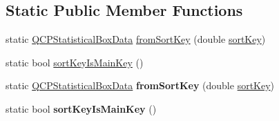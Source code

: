 \subsection*{Static Public Member Functions}
\begin{DoxyCompactItemize}
\item 
static \hyperlink{class_q_c_p_statistical_box_data}{Q\+C\+P\+Statistical\+Box\+Data} \hyperlink{class_q_c_p_statistical_box_data_a8c391d5a6c7cebc79b664aad9917b499}{from\+Sort\+Key} (double \hyperlink{class_q_c_p_statistical_box_data_ad00ab8d43ec89a40ec7ee7ca154a2b0e}{sort\+Key})
\item 
static bool \hyperlink{class_q_c_p_statistical_box_data_a4710ae44b85d4b34b13c3f9301f28c01}{sort\+Key\+Is\+Main\+Key} ()
\item 
static \hyperlink{class_q_c_p_statistical_box_data}{Q\+C\+P\+Statistical\+Box\+Data} {\bfseries from\+Sort\+Key} (double \hyperlink{class_q_c_p_statistical_box_data_ad00ab8d43ec89a40ec7ee7ca154a2b0e}{sort\+Key})\hypertarget{class_q_c_p_statistical_box_data_a8c391d5a6c7cebc79b664aad9917b499}{}\label{class_q_c_p_statistical_box_data_a8c391d5a6c7cebc79b664aad9917b499}

\item 
static bool {\bfseries sort\+Key\+Is\+Main\+Key} ()\hypertarget{class_q_c_p_statistical_box_data_ad1f57b586f3a473f6f006dc4d505159b}{}\label{class_q_c_p_statistical_box_data_ad1f57b586f3a473f6f006dc4d505159b}

\end{DoxyCompactItemize}
